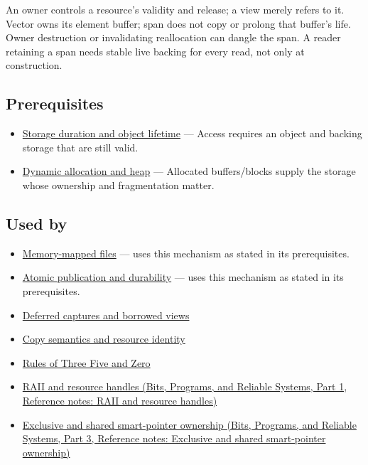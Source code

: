 An owner controls a resource's validity and release; a view merely refers to it. Vector owns its element buffer; span does not copy or prolong that buffer's life. Owner destruction or invalidating reallocation can dangle the span. A reader retaining a span needs stable live backing for every read, not only at construction.

\subsection{Prerequisites}\label{appendix-d52e4486f527-prerequisites}

\hypertarget{appendix-d52e4486f527-prerequisites}{}

\begin{itemize}
\tightlist
\item
  \hyperref[appendix-0b104bcba06b]{Storage duration and object lifetime} --- Access requires an object and backing storage that are still valid.
\item
  \hyperref[appendix-c3480f7d9ff3]{Dynamic allocation and heap} --- Allocated buffers/blocks supply the storage whose ownership and fragmentation matter.
\end{itemize}

\subsection{Used by}\label{appendix-d52e4486f527-used-by}

\hypertarget{appendix-d52e4486f527-used-by}{}

\begin{itemize}
\tightlist
\item
  \hyperref[appendix-313ee7a0ba7b]{Memory-mapped files} --- uses this mechanism as stated in its prerequisites.
\item
  \hyperref[appendix-e89a8f290ef5]{Atomic publication and durability} --- uses this mechanism as stated in its prerequisites.
\item
  \hyperref[appendix-aea529eb5175]{Deferred captures and borrowed views}
\item
  \hyperref[appendix-1340cd1ce582]{Copy semantics and resource identity}
\item
  \hyperref[appendix-7679107d057e]{Rules of Three Five and Zero}
\item
  \href{../01-Bits-Programs-and-Reliable-Systems-P01/main.pdf\#appendix-69739d3ab49b}{RAII and resource handles (Bits, Programs, and Reliable Systems, Part 1, Reference notes: RAII and resource handles)}
\item
  \href{../01-Bits-Programs-and-Reliable-Systems-P03/main.pdf\#appendix-51602cabe815}{Exclusive and shared smart-pointer ownership (Bits, Programs, and Reliable Systems, Part 3, Reference notes: Exclusive and shared smart-pointer ownership)}
\end{itemize}

